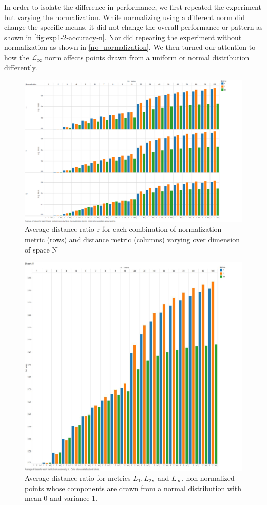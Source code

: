 \documentclass{article}
\begin{document}
In order to isolate the difference in performance, we first repeated the experiment but varying the normalization. While normalizing using a different norm did change the specific means, it did not change the overall performance or pattern as shown in \ref{fig:exp1-2-accuracy-n}. Nor did repeating the experiment without normalization as shown in \ref{no_normalization}. We then turned our attention to how the $\mathcal{L}_{\infty}$ norm affects points drawn from a uniform or normal distribution differently.
\
\begin{figure}[H]
\centering
        \includegraphics[width=\textwidth]{normalization_metrics.png}
        \caption{Average distance ratio r for each combination of normalization metric (rows) and distance metric (columns) varying over dimension of space N}
        \label{fig:normmetrics}
\end{figure}

\begin{figure}[H]
\centering
        \includegraphics[width=\textwidth]{exp2without_normalization.jpg}
        \caption{Average distance ratio for metrics $L_1,L_2,$ and $L_{\infty}$, non-normalized points whose components are drawn from a normal distribution with mean 0 and variance 1.}
        \label{fig:no_normalization}
\end{figure}
\end{document}
